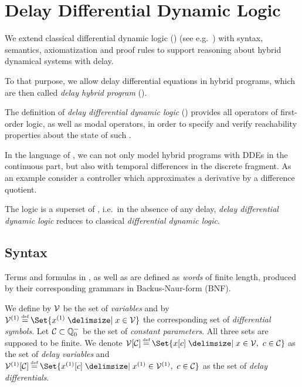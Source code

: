 \chapter{Delay Differential Dynamic Logic}
\label{ch:delay-differential-dynamic-logic}

We extend classical differential dynamic logic (\dL) (see e.g.~\cite{Platzer12LogicsDynSys}) with syntax, semantics, axiomatization and proof rules to support reasoning about hybrid dynamical systems with delay.

To that purpose, we allow delay differential equations in hybrid programs, which are then called \emph{delay hybrid program} (\dHP).

The definition of \emph{delay differential dynamic logic} (\ddL) provides all operators of first-order logic, as well as modal operators, in order to specify and verify reachability properties about the state of such \dHPs.

In the language of \ddL, we can not only model hybrid programs with DDEs in the continuous part, but also with temporal differences in the discrete fragment.
As an example consider a controller which approximates a derivative by a difference quotient.

The logic \ddL is a superset of \dL, i.e.\ in the absence of any delay, \emph{delay differential dynamic logic} reduces to classical \emph{differential dynamic logic}.



\section{Syntax}
    \label{sec:syntax}

    Terms and formulas in \ddL, as well as \dHPs are defined as \emph{words} of finite length, produced by their corresponding grammars in Backus-Naur-form (BNF).

    We define by $\mathcal{V}$ be the set of \emph{variables} and by $\diffvars\defeq\Set{\D{x} \with x\in\allvars}$ the corresponding set of \emph{differential symbols}.
    Let $\mathcal{C}_{}\subset\mathbb{Q}^-_0$ be the set of \emph{constant parameters}.
    All three sets are supposed to be finite.
    We denote $\delayvars\defeq\Set{\x[c] \with x\in\allvars,\ c\in\constants}$ as the set of \emph{delay variables} and $\delaydiffvars\defeq\Set{\Dx[c] \with \D{x}\in\diffvars,\ c\in\constants}$ as the set of \emph{delay differentials}.

